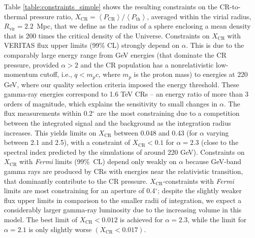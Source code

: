 \documentclass[12pt,manuscript]{aastex}
\def\Fermi{{\em Fermi}\xspace}
\newcommand{\expval}[1]{\left\langle #1 \right\rangle}
\newcommand{\rmn}{\mathrm}
\newcommand{\CR}{\mathrm{CR}}
\begin{document}
Table \ref{table:constraints_simple} shows the resulting constraints on the CR-to-thermal
pressure ratio, $X_{\CR} = \expval{P_{\CR}}/\expval{P_\rmn{th}}$, averaged within the virial radius,
$R_\rmn{vir}=2.2$~Mpc, that we define as the radius of a sphere enclosing a mean density that is 200
times the critical density of the Universe. Constraints on $X_\CR$ with 
VERITAS flux upper limits (99\% CL) strongly depend on $\alpha$.
This is due to the comparably large energy range from GeV
energies (that dominate the CR pressure, provided $\alpha>2$ and the CR population has a
nonrelativistic low-momentum cutoff, i.e., $q<m_{p}c$, where $m_{p}$ is the proton mass) to energies
at 220 GeV, where our quality selection criteria imposed the energy threshold. These gamma-ray
energies correspond to 1.6 TeV CRs -- an energy ratio of more than 3 orders of magnitude, which
explains the sensitivity to small changes in $\alpha$. The flux measurements within 0.2$^{\circ}$
are the most constraining due to a competition between the integrated signal and the background as
the integration radius increases.  This yields limits on $X_\CR$ between 0.048 and 0.43 (for
$\alpha$ varying between 2.1 and 2.5), with a constraint of $X_\CR<0.1$ for $\alpha=2.3$ (close to
the spectral index predicted by the simulations of \citet{article:PinzkePfrommer:2010} around 220
GeV). Constraints on $X_\CR$ with \Fermi limits (99\%\ CL) depend only weakly on $\alpha$ because GeV-band gamma rays are produced by CRs with energies near the relativistic transition, that dominantly contribute to the CR pressure.
$X_\CR$-constraints with \Fermi limits are most constraining for an aperture of
0.4$^{\circ}$; despite the slightly weaker flux upper limits in comparison to the smaller radii of
integration, we expect a considerably larger gamma-ray luminosity due to the increasing volume in
this model. The best limit of $X_\CR< 0.012$ is achieved for $\alpha=2.3$, while the limit for
$\alpha=2.1$ is only slightly worse $(X_\CR<0.017)$.
\end{document}
